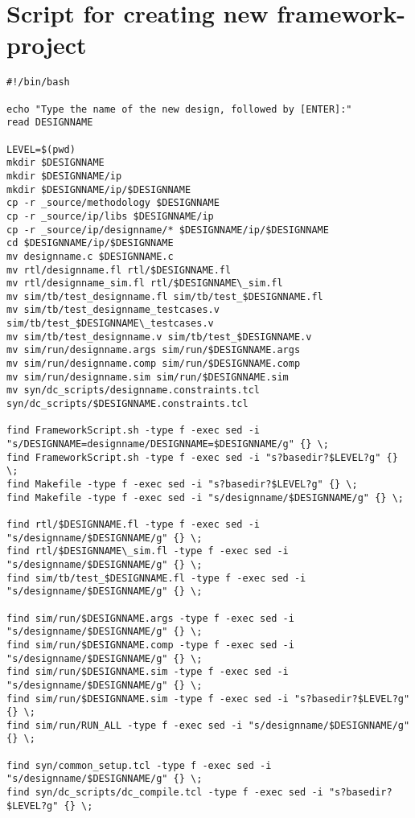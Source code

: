 \section{\label{sec:newprojectsourcecode}Script for creating new framework-project}
\lstset{language=[gnu] make, style=Cstyle, morestring=[s]""}
\begin{lstlisting}
#!/bin/bash

echo "Type the name of the new design, followed by [ENTER]:"
read DESIGNNAME

LEVEL=$(pwd)
mkdir $DESIGNNAME
mkdir $DESIGNNAME/ip
mkdir $DESIGNNAME/ip/$DESIGNNAME
cp -r _source/methodology $DESIGNNAME
cp -r _source/ip/libs $DESIGNNAME/ip
cp -r _source/ip/designname/* $DESIGNNAME/ip/$DESIGNNAME
cd $DESIGNNAME/ip/$DESIGNNAME
mv designname.c $DESIGNNAME.c
mv rtl/designname.fl rtl/$DESIGNNAME.fl
mv rtl/designname_sim.fl rtl/$DESIGNNAME\_sim.fl
mv sim/tb/test_designname.fl sim/tb/test_$DESIGNNAME.fl
mv sim/tb/test_designname_testcases.v sim/tb/test_$DESIGNNAME\_testcases.v
mv sim/tb/test_designname.v sim/tb/test_$DESIGNNAME.v
mv sim/run/designname.args sim/run/$DESIGNNAME.args
mv sim/run/designname.comp sim/run/$DESIGNNAME.comp
mv sim/run/designname.sim sim/run/$DESIGNNAME.sim
mv syn/dc_scripts/designname.constraints.tcl syn/dc_scripts/$DESIGNNAME.constraints.tcl

find FrameworkScript.sh -type f -exec sed -i "s/DESIGNNAME=designname/DESIGNNAME=$DESIGNNAME/g" {} \;
find FrameworkScript.sh -type f -exec sed -i "s?basedir?$LEVEL?g" {} \;
find Makefile -type f -exec sed -i "s?basedir?$LEVEL?g" {} \;
find Makefile -type f -exec sed -i "s/designname/$DESIGNNAME/g" {} \;

find rtl/$DESIGNNAME.fl -type f -exec sed -i "s/designname/$DESIGNNAME/g" {} \;
find rtl/$DESIGNNAME\_sim.fl -type f -exec sed -i "s/designname/$DESIGNNAME/g" {} \;
find sim/tb/test_$DESIGNNAME.fl -type f -exec sed -i "s/designname/$DESIGNNAME/g" {} \;

find sim/run/$DESIGNNAME.args -type f -exec sed -i "s/designname/$DESIGNNAME/g" {} \;
find sim/run/$DESIGNNAME.comp -type f -exec sed -i "s/designname/$DESIGNNAME/g" {} \;
find sim/run/$DESIGNNAME.sim -type f -exec sed -i "s/designname/$DESIGNNAME/g" {} \;
find sim/run/$DESIGNNAME.sim -type f -exec sed -i "s?basedir?$LEVEL?g" {} \;
find sim/run/RUN_ALL -type f -exec sed -i "s/designname/$DESIGNNAME/g" {} \;

find syn/common_setup.tcl -type f -exec sed -i "s/designname/$DESIGNNAME/g" {} \;
find syn/dc_scripts/dc_compile.tcl -type f -exec sed -i "s?basedir?$LEVEL?g" {} \;
\end{lstlisting}
\clearpage
